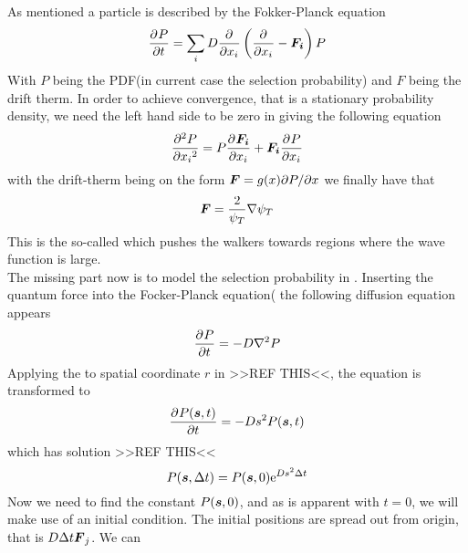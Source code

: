         As mentioned a particle is described by the Fokker-Planck equation
            \begin{equation}
                \FokkerPlanck
                \label{eq:FokkerPlanckDef}
            \end{equation}
        With $P$ being the PDF(in current case the selection probability) and
        $F$ being the drift therm. In order to achieve convergence, that is a
        stationary probability density, we need the left hand side to be zero
        in  giving the following equation
            \begin{equation}
                \prd{x_i}[P][2] = P\prd{x_i}[\mb{F_i}] + \mb{F_i}\prd{x_i}[P]
            \end{equation}
        with the drift-therm being on the form $\boldsymbol{{F}}=g(x)\mathrm{\partial} P/\mathrm{\partial} x$ we
        finally have that
            \begin{equation}
                \boldsymbol{{F}} = \frac{2}{\psi_T}\nabla \psi_T
                \label{eq:qForceDef}
            \end{equation}
        This is the so-called  which pushes the walkers
        towards regions where the wave function is large. \\
        The missing part now is to model the selection probability in
        . Inserting the quantum force into the
        Focker-Planck equation( the following diffusion
        equation appears
            \begin{equation}
                \prd{t}[P] = -D\nabla^2 P
                \label{eq:diffeqFP}
            \end{equation}
        Applying the  to spatial coordinate $r$ in
         >>REF THIS<<, the equation is transformed to
            \begin{equation}
                \prd{t}[P(\blds{s},t)] = -Ds^2 P(\blds{s},t)
            \end{equation}
        which has solution >>REF THIS<<
            \begin{equation}
                P(\boldsymbol{{s}},\Delta t) = P(\boldsymbol{{s}},0)\mathrm{e}^{Ds^2\Delta t}
                \label{eq:Punfin}
            \end{equation}
        Now we need to find the constant $P(\boldsymbol{{s}},0)$, and as is apparent
        with $t=0$, we will make use of an initial condition. The initial
        positions are spread out from origin, that is $D\Delta t\boldsymbol{{F}}_j$. We can
